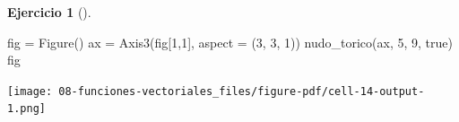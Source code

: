 \documentclass[
  a4paper,
]{scrreport}
\newenvironment{Shaded}{\begin{snugshade}}{\end{snugshade}}
\newcommand{\ConstantTok}[1]{\textcolor[rgb]{0.56,0.35,0.01}{#1}}
\newcommand{\FloatTok}[1]{\textcolor[rgb]{0.68,0.00,0.00}{#1}}
\newcommand{\FunctionTok}[1]{\textcolor[rgb]{0.28,0.35,0.67}{#1}}
\newcommand{\NormalTok}[1]{\textcolor[rgb]{0.00,0.23,0.31}{#1}}
\newcommand{\OperatorTok}[1]{\textcolor[rgb]{0.37,0.37,0.37}{#1}}
\theoremstyle{definition}
\newtheorem{exercise}{Ejercicio}[chapter]
\theoremstyle{remark}
\begin{document}
\begin{exercise}[]
\begin{enumerate}
\begin{tcolorbox}
\begin{Shaded}
\begin{Highlighting}[]
\NormalTok{fig }\OperatorTok{=} \FunctionTok{Figure}\NormalTok{()}
\NormalTok{ax }\OperatorTok{=} \FunctionTok{Axis3}\NormalTok{(fig[}\FloatTok{1}\NormalTok{,}\FloatTok{1}\NormalTok{], aspect }\OperatorTok{=}\NormalTok{ (}\FloatTok{3}\NormalTok{, }\FloatTok{3}\NormalTok{, }\FloatTok{1}\NormalTok{))}
\FunctionTok{nudo\_torico}\NormalTok{(ax, }\FloatTok{5}\NormalTok{, }\FloatTok{9}\NormalTok{, }\ConstantTok{true}\NormalTok{)}
\NormalTok{fig}
\end{Highlighting}
\end{Shaded}

  \texttt{[image: 08-funciones-vectoriales\_files/figure-pdf/cell-14-output-1.png]}

  \end{tcolorbox}
\end{enumerate}

\end{exercise}
\end{document}
